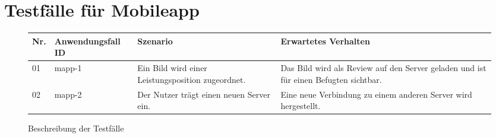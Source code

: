 \newpage
\section{Testfälle für Mobileapp}

\begin{figure}[!h]
	\begin{center}
		\begin{tabularx}{\textwidth}{ p{} | p{} | p{} | X }
			\textbf{Nr.} & \textbf{Anwendungsfall ID} & \textbf{Szenario} & \textbf{Erwartetes Verhalten} \\ \hline
			01 & mapp-1 & Ein Bild wird einer Leistungsposition zugeordnet. & Das Bild wird als Review auf den Server geladen und ist für einen Befugten sichtbar. \\ \hline
			02 & mapp-2 & Der Nutzer trägt einen neuen Server ein. & Eine neue Verbindung zu einem anderen Server wird hergestellt. \\ \hline
		\end{tabularx}	
	\end{center}
	\caption{Beschreibung der Testfälle}
	\label{fig:testfaelle-mobile-app-tabelle}
\end{figure}